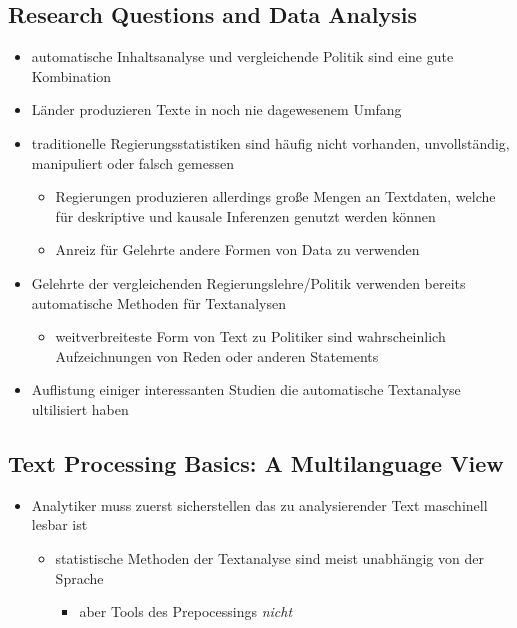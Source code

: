 \documentclass[11pt]{article}
\begin{document}
\subsection{Research Questions and Data Analysis}
\label{sec:org3aea392}
\begin{itemize}
\item automatische Inhaltsanalyse und vergleichende Politik sind eine gute Kombination
\item Länder produzieren Texte in noch nie dagewesenem Umfang
\item traditionelle Regierungsstatistiken sind häufig nicht vorhanden, unvollständig, manipuliert oder falsch gemessen 
\begin{itemize}
\item Regierungen produzieren allerdings große Mengen an Textdaten, welche für deskriptive und kausale Inferenzen genutzt werden können
\item Anreiz für Gelehrte andere Formen von Data zu verwenden
\end{itemize}
\item Gelehrte der vergleichenden Regierungslehre/Politik verwenden bereits automatische Methoden für Textanalysen
\begin{itemize}
\item weitverbreiteste Form von Text zu Politiker sind wahrscheinlich Aufzeichnungen von Reden oder anderen Statements
\end{itemize}
\item Auflistung einiger interessanten Studien die automatische Textanalyse ultilisiert haben
\end{itemize}
\subsection{Text Processing Basics: A Multilanguage View}
\label{sec:orga4b23a2}
\begin{itemize}
\item Analytiker muss zuerst sicherstellen das zu analysierender Text maschinell lesbar ist
\begin{itemize}
\item statistische Methoden der Textanalyse sind meist unabhängig von der Sprache
\begin{itemize}
\item aber Tools des Prepocessings \emph{nicht}
\end{itemize}
\end{itemize}
\end{itemize}
\end{document}
